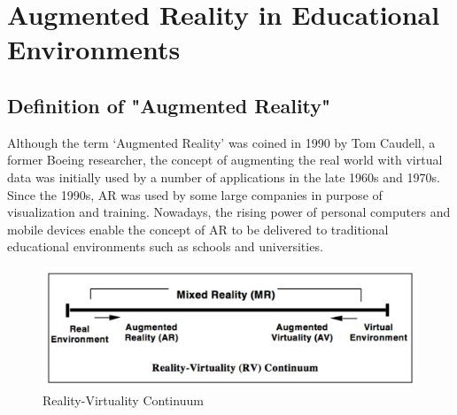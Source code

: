 \section{Augmented Reality in Educational Environments}
\label{sec:AugmentedRealityInEducationalEnvironments}
\subsection{Definition of "Augmented Reality"}
\label{subsec:DefinitionAR}
Although the term ‘Augmented Reality’ was coined in 1990 by Tom Caudell, a former Boeing researcher, the concept of augmenting the real world with virtual data was initially used by a number of applications in the late 1960s and 1970s. Since the 1990s, AR was used by some large companies in purpose of visualization and training. Nowadays, the rising power of personal computers and mobile devices enable the concept of AR to be delivered to traditional educational environments such as schools and universities. \autocite [cf.][21]{Johnson.2010} 
\vspace{1.15em}
\begin{figure}[ptbh]
    \centering
    \includegraphics[width=\linewidth]{figures/rvc.png}
    \caption[Reality-Virtuality Continuum]{Reality-Virtuality Continuum\footnotemark}
    \label{fig:RealityVirtualityContinuum}
\end{figure}


